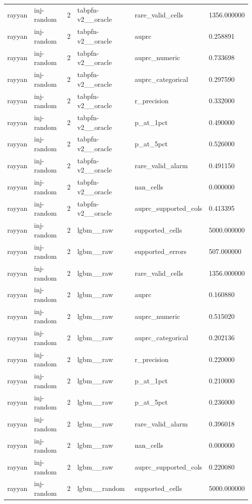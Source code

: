 \begin{tabular}{llllll}
rayyan & inj-random & 2 & tabpfn-v2\_\_oracle & rare\_valid\_cells & 1356.000000 \\
rayyan & inj-random & 2 & tabpfn-v2\_\_oracle & auprc & 0.258891 \\
rayyan & inj-random & 2 & tabpfn-v2\_\_oracle & auprc\_numeric & 0.733698 \\
rayyan & inj-random & 2 & tabpfn-v2\_\_oracle & auprc\_categorical & 0.297590 \\
rayyan & inj-random & 2 & tabpfn-v2\_\_oracle & r\_precision & 0.332000 \\
rayyan & inj-random & 2 & tabpfn-v2\_\_oracle & p\_at\_1pct & 0.490000 \\
rayyan & inj-random & 2 & tabpfn-v2\_\_oracle & p\_at\_5pct & 0.526000 \\
rayyan & inj-random & 2 & tabpfn-v2\_\_oracle & rare\_valid\_alarm & 0.491150 \\
rayyan & inj-random & 2 & tabpfn-v2\_\_oracle & nan\_cells & 0.000000 \\
rayyan & inj-random & 2 & tabpfn-v2\_\_oracle & auprc\_supported\_cols & 0.413395 \\
rayyan & inj-random & 2 & lgbm\_\_raw & supported\_cells & 5000.000000 \\
rayyan & inj-random & 2 & lgbm\_\_raw & supported\_errors & 507.000000 \\
rayyan & inj-random & 2 & lgbm\_\_raw & rare\_valid\_cells & 1356.000000 \\
rayyan & inj-random & 2 & lgbm\_\_raw & auprc & 0.160880 \\
rayyan & inj-random & 2 & lgbm\_\_raw & auprc\_numeric & 0.515020 \\
rayyan & inj-random & 2 & lgbm\_\_raw & auprc\_categorical & 0.202136 \\
rayyan & inj-random & 2 & lgbm\_\_raw & r\_precision & 0.220000 \\
rayyan & inj-random & 2 & lgbm\_\_raw & p\_at\_1pct & 0.210000 \\
rayyan & inj-random & 2 & lgbm\_\_raw & p\_at\_5pct & 0.236000 \\
rayyan & inj-random & 2 & lgbm\_\_raw & rare\_valid\_alarm & 0.396018 \\
rayyan & inj-random & 2 & lgbm\_\_raw & nan\_cells & 0.000000 \\
rayyan & inj-random & 2 & lgbm\_\_raw & auprc\_supported\_cols & 0.220080 \\
rayyan & inj-random & 2 & lgbm\_\_random & supported\_cells & 5000.000000 \\

\end{tabular}
